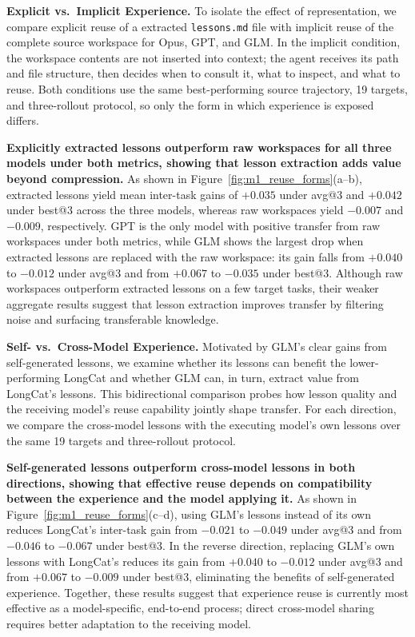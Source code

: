 \textbf{Explicit vs.\ Implicit Experience.}
\label{sec:implicit}
To isolate the effect of representation, we compare explicit reuse of a extracted \texttt{lessons.md} file with implicit reuse of the complete source workspace for Opus, GPT, and GLM.
In the implicit condition, the workspace contents are not inserted into context; the agent receives its path and file structure, then decides when to consult it, what to inspect, and what to reuse.
Both conditions use the same best-performing source trajectory, 19 targets, and three-rollout protocol, so only the form in which experience is exposed differs.

\textbf{Explicitly extracted lessons outperform raw workspaces for all three models under both metrics, showing that lesson extraction adds value beyond compression.}
As shown in Figure~\ref{fig:m1_reuse_forms}(a--b), extracted lessons yield mean inter-task gains of $+0.035$ under avg@3 and $+0.042$ under best@3 across the three models, whereas raw workspaces yield $-0.007$ and $-0.009$, respectively.
GPT is the only model with positive transfer from raw workspaces under both metrics, while GLM shows the largest drop when extracted lessons are replaced with the raw workspace: its gain falls from $+0.040$ to $-0.012$ under avg@3 and from $+0.067$ to $-0.035$ under best@3.
Although raw workspaces outperform extracted lessons on a few target tasks, their weaker aggregate results suggest that lesson extraction improves transfer by filtering noise and surfacing transferable knowledge.


\textbf{Self- vs.\ Cross-Model Experience.}
\label{sec:cross_model_reuse}
Motivated by GLM's clear gains from self-generated lessons, we examine whether its lessons can benefit the lower-performing LongCat and whether GLM can, in turn, extract value from LongCat's lessons.
This bidirectional comparison probes how lesson quality and the receiving model's reuse capability jointly shape transfer.
For each direction, we compare the cross-model lessons with the executing model's own lessons over the same 19 targets and three-rollout protocol.

\textbf{Self-generated lessons outperform cross-model lessons in both directions, showing that effective reuse depends on compatibility between the experience and the model applying it.}
As shown in Figure~\ref{fig:m1_reuse_forms}(c--d), using GLM's lessons instead of its own reduces LongCat's inter-task gain from $-0.021$ to $-0.049$ under avg@3 and from $-0.046$ to $-0.067$ under best@3.
In the reverse direction, replacing GLM's own lessons with LongCat's reduces its gain from $+0.040$ to $-0.012$ under avg@3 and from $+0.067$ to $-0.009$ under best@3, eliminating the benefits of self-generated experience.
Together, these results suggest that experience reuse is currently most effective as a model-specific, end-to-end process; direct cross-model sharing requires better adaptation to the receiving model.


